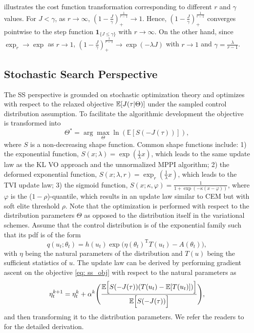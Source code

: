 \documentclass[twoside,11pt]{article}
\begin{document}
 illustrates the cost function transformation corresponding to different $r$ and $\gamma$ values.
For $J < \gamma$, as $r \rightarrow \infty$, $\left(1-\frac{J}{\gamma}\right)_+^{\frac{1}{r-1}} \rightarrow 1$.
Hence, $\left(1-\frac{J}{\gamma}\right)_+^{\frac{1}{r-1}}$ converges pointwise to the step function $\bm{1}_{ \{J \leq \gamma\} }$ with $r \to \infty$.
On the other hand, since $\exp_r\rightarrow\exp$ as $r\rightarrow 1$, $\left(1-\frac{J}{\gamma}\right)_+^{\frac{1}{r-1}}\rightarrow \exp(-\lambda J)$ with $r\rightarrow 1$ and $\gamma=\frac{\lambda}{r-1}$.

\subsection{Stochastic Search Perspective}
\label{sec: ss}
The \ac{SS} perspective \citep{boutselis2020constrained, wang2021adaptive} is grounded on stochastic optimization theory and optimizes with respect to the relaxed objective $\mathbb{E}[J(\tau|\Theta)]$ under the sampled control distribution assumption. To facilitate the algorithmic development the objective is transformed into 
\begin{equation} \label{eq: ss_obj}
\Theta^* = \arg\max_\Theta \ln\left(\mathbb{E}\left[S\left(- J(\tau)\right)\right]\right),
\end{equation}
where $S$ is a non-decreasing shape function. Common shape functions include: 1) the exponential function, $S(x;\lambda)=\exp(\frac{1}{\lambda} x)$, which leads to the same update law as the KL \ac{VO} approach and the unnormalized \ac{MPPI} algorithm; 2) the deformed exponential function, $S(x;\lambda, r)=\exp_r(\frac{1}{\lambda} x)$, which leads to the \ac{TVI} update law; 3) the sigmoid function, $S(x; \kappa, \varphi)=\tfrac{1}{1+\exp(-\kappa(x-\varphi))}$, where $\varphi$ is the ($1-\rho$)-quantile, which results in an update law similar to \ac{CEM} but with soft elite threshold $\rho$. Note that the optimization is performed with respect to the distribution parameters $\Theta$ as opposed to the distribution itself in the variational schemes. Assume that the control distribution is of the exponential family such that its pdf is of the form
\begin{equation}\label{eq: exponential_family_pdf}
q(u_t;\theta_t) = h(u_t)\exp\Big(\eta(\theta_t)^\mathrm{T}T(u_t)-A(\theta_t)\Big),
\end{equation}
with $\eta$ being the natural parameters of the distribution and $T(u)$ being the sufficient statistics of $u$. The update law can be derived by performing gradient ascent on the objective \eqref{eq: ss_obj} with respect to the natural parameters as
\begin{equation} \label{eq: ss_natural_param_update}
\eta_t^{k+1} 
= \eta_t^k + \alpha^k\Bigg(\frac{\mathbb{E}\Big[S(-J(\tau)) (T(u_t) - \mathbb{E}[T(u_t)]) \Big]}{\mathbb{E} \Big[S(-J(\tau))\Big]}\Bigg),
\end{equation}
and then transforming it to the distribution parameters. We refer the readers to  for the detailed derivation.
\end{document}
